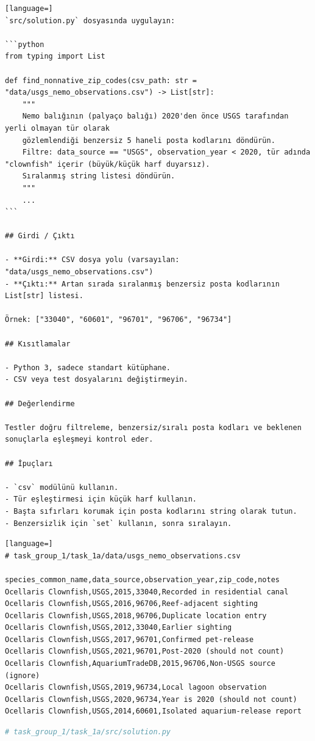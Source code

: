 \begin{appendices}
\begin{lstlisting}[language=]
`src/solution.py` dosyasında uygulayın:

```python
from typing import List

def find_nonnative_zip_codes(csv_path: str = "data/usgs_nemo_observations.csv") -> List[str]:
    """
    Nemo balığının (palyaço balığı) 2020'den önce USGS tarafından yerli olmayan tür olarak 
    gözlemlendiği benzersiz 5 haneli posta kodlarını döndürün.
    Filtre: data_source == "USGS", observation_year < 2020, tür adında "clownfish" içerir (büyük/küçük harf duyarsız).
    Sıralanmış string listesi döndürün.
    """
    ...
```

## Girdi / Çıktı

- **Girdi:** CSV dosya yolu (varsayılan: "data/usgs_nemo_observations.csv")
- **Çıktı:** Artan sırada sıralanmış benzersiz posta kodlarının List[str] listesi.

Örnek: ["33040", "60601", "96701", "96706", "96734"]

## Kısıtlamalar

- Python 3, sadece standart kütüphane.
- CSV veya test dosyalarını değiştirmeyin.

## Değerlendirme

Testler doğru filtreleme, benzersiz/sıralı posta kodları ve beklenen sonuçlarla eşleşmeyi kontrol eder.

## İpuçları

- `csv` modülünü kullanın.
- Tür eşleştirmesi için küçük harf kullanın.
- Başta sıfırları korumak için posta kodlarını string olarak tutun.
- Benzersizlik için `set` kullanın, sonra sıralayın.
\end{lstlisting}
\begin{lstlisting}[language=]
# task_group_1/task_1a/data/usgs_nemo_observations.csv

species_common_name,data_source,observation_year,zip_code,notes
Ocellaris Clownfish,USGS,2015,33040,Recorded in residential canal
Ocellaris Clownfish,USGS,2016,96706,Reef-adjacent sighting
Ocellaris Clownfish,USGS,2018,96706,Duplicate location entry
Ocellaris Clownfish,USGS,2012,33040,Earlier sighting
Ocellaris Clownfish,USGS,2017,96701,Confirmed pet-release
Ocellaris Clownfish,USGS,2021,96701,Post-2020 (should not count)
Ocellaris Clownfish,AquariumTradeDB,2015,96706,Non-USGS source (ignore)
Ocellaris Clownfish,USGS,2019,96734,Local lagoon observation
Ocellaris Clownfish,USGS,2020,96734,Year is 2020 (should not count)
Ocellaris Clownfish,USGS,2014,60601,Isolated aquarium-release report
\end{lstlisting}
\begin{lstlisting}[language=Python]
# task_group_1/task_1a/src/solution.py


\end{lstlisting}
\end{appendices}
